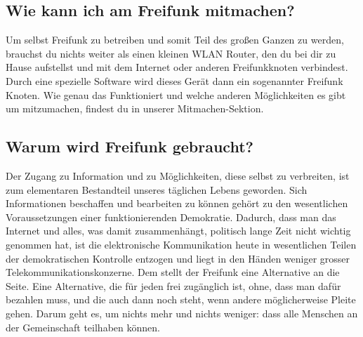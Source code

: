\subsection{Wie kann ich am Freifunk mitmachen?}

Um selbst Freifunk zu betreiben und somit Teil des großen Ganzen zu werden, brauchst du nichts weiter als einen kleinen WLAN Router, den du bei dir zu Hause aufstellst und mit dem Internet oder anderen Freifunkknoten verbindest. Durch eine spezielle Software wird dieses Gerät dann ein sogenannter Freifunk Knoten.
Wie genau das Funktioniert und welche anderen Möglichkeiten es gibt um mitzumachen, findest du in unserer Mitmachen-Sektion.



\subsection{Warum wird Freifunk gebraucht?}
Der Zugang zu Information und zu Möglichkeiten, diese selbst zu verbreiten, ist zum elementaren Bestandteil unseres täglichen Lebens geworden. Sich Informationen beschaffen und bearbeiten zu können gehört zu den wesentlichen Voraussetzungen einer funktionierenden Demokratie. Dadurch, dass man das Internet und alles, was damit zusammenhängt, politisch lange Zeit nicht wichtig genommen hat, ist die elektronische Kommunikation heute in wesentlichen Teilen der demokratischen Kontrolle entzogen und liegt in den Händen weniger grosser Telekommunikationskonzerne. Dem stellt der Freifunk eine Alternative an die Seite. Eine Alternative, die für jeden frei zugänglich ist, ohne, dass man dafür bezahlen muss, und die auch dann noch steht, wenn andere möglicherweise Pleite gehen. Darum geht es, um nichts mehr und nichts weniger: dass alle Menschen an der Gemeinschaft teilhaben können.
